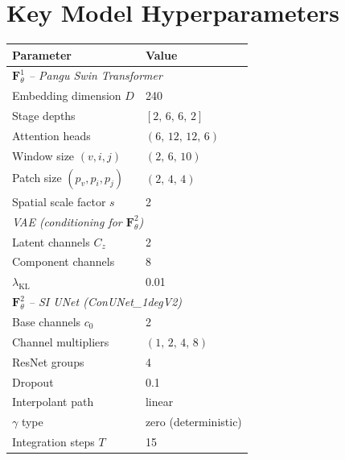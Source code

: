 \documentclass[11pt]{article}
\begin{document}
\section{Key Model Hyperparameters}

\begin{table}[h]
\centering
\begin{tabular}{ll}
\toprule
\textbf{Parameter} & \textbf{Value} \\
\midrule
\multicolumn{2}{l}{\textit{$\mathbf{F}^1_\theta$ -- Pangu Swin Transformer}} \\
\quad Embedding dimension $D$                          & 240 \\
\quad Stage depths                                     & $[2,\,6,\,6,\,2]$ \\
\quad Attention heads                                  & $(6,\,12,\,12,\,6)$ \\
\quad Window size $(v, i, j)$                          & $(2,\,6,\,10)$ \\
\quad Patch size $(p_v, p_i, p_j)$                     & $(2,\,4,\,4)$ \\
\quad Spatial scale factor $s$                         & 2 \\
\midrule
\multicolumn{2}{l}{\textit{VAE (conditioning for $\mathbf{F}^2_\theta$)}} \\
\quad Latent channels $C_z$                            & 2 \\
\quad Component channels                               & 8 \\
\quad $\lambda_{\mathrm{KL}}$                          & 0.01 \\
\midrule
\multicolumn{2}{l}{\textit{$\mathbf{F}^2_\theta$ -- SI UNet (ConUNet\_1degV2)}} \\
\quad Base channels $c_0$                              & 2 \\
\quad Channel multipliers                              & $(1,\,2,\,4,\,8)$ \\
\quad ResNet groups                                    & 4 \\
\quad Dropout                                          & 0.1 \\
\quad Interpolant path                                 & linear \\
\quad $\gamma$ type                                    & zero (deterministic) \\
\quad Integration steps $T$                            & 15 \\

\end{tabular}
\end{table}
\end{document}
